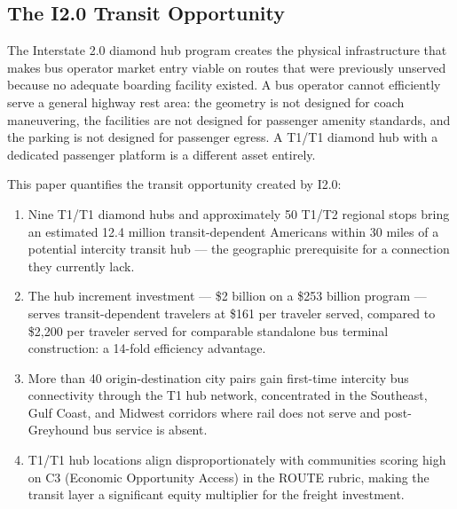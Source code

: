 \subsection{The I2.0 Transit Opportunity}

The Interstate 2.0 diamond hub program creates the physical infrastructure that makes bus operator market entry viable on routes that were previously unserved because no adequate boarding facility existed. A bus operator cannot efficiently serve a general highway rest area: the geometry is not designed for coach maneuvering, the facilities are not designed for passenger amenity standards, and the parking is not designed for passenger egress. A T1/T1 diamond hub with a dedicated passenger platform is a different asset entirely.

This paper quantifies the transit opportunity created by I2.0:
\begin{enumerate}
  \item Nine T1/T1 diamond hubs and approximately 50 T1/T2 regional stops bring an estimated 12.4 million transit-dependent Americans within 30 miles of a potential intercity transit hub --- the geographic prerequisite for a connection they currently lack.
  \item The hub increment investment --- \$2 billion on a \$253 billion program --- serves transit-dependent travelers at \$161 per traveler served, compared to \$2,200 per traveler served for comparable standalone bus terminal construction: a 14-fold efficiency advantage.
  \item More than 40 origin-destination city pairs gain first-time intercity bus connectivity through the T1 hub network, concentrated in the Southeast, Gulf Coast, and Midwest corridors where rail does not serve and post-Greyhound bus service is absent.
  \item T1/T1 hub locations align disproportionately with communities scoring high on C3 (Economic Opportunity Access) in the ROUTE rubric, making the transit layer a significant equity multiplier for the freight investment.
\end{enumerate}


